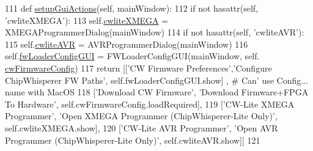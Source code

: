 \begin{DoxyCode}
111     \textcolor{keyword}{def }\hyperlink{classsoftware_1_1chipwhisperer_1_1capture_1_1scopes_1_1openadc__interface_1_1naeusbchip_1_1OpenADCInterface__NAEUSBChip_a3b6ab69776259d4e281d13ce0091c849}{setupGuiActions}(self, mainWindow):
112         \textcolor{keywordflow}{if} \textcolor{keywordflow}{not} hasattr(self, \textcolor{stringliteral}{'cwliteXMEGA'}):
113             self.\hyperlink{classsoftware_1_1chipwhisperer_1_1capture_1_1scopes_1_1openadc__interface_1_1naeusbchip_1_1OpenADCInterface__NAEUSBChip_a6f6ba8bdef3267e43fbfa3025093ef13}{cwliteXMEGA} = XMEGAProgrammerDialog(mainWindow)
114         \textcolor{keywordflow}{if} \textcolor{keywordflow}{not} hasattr(self, \textcolor{stringliteral}{'cwliteAVR'}):
115             self.\hyperlink{classsoftware_1_1chipwhisperer_1_1capture_1_1scopes_1_1openadc__interface_1_1naeusbchip_1_1OpenADCInterface__NAEUSBChip_a4fad83161be25b968ae0066a5a3669df}{cwliteAVR} = AVRProgrammerDialog(mainWindow)
116         self.\hyperlink{classsoftware_1_1chipwhisperer_1_1capture_1_1scopes_1_1openadc__interface_1_1naeusbchip_1_1OpenADCInterface__NAEUSBChip_a2e3c1b3892903a9cf622d20e1898bdc6}{fwLoaderConfigGUI} = FWLoaderConfigGUI(mainWindow, self.
      \hyperlink{classsoftware_1_1chipwhisperer_1_1capture_1_1scopes_1_1openadc__interface_1_1naeusbchip_1_1OpenADCInterface__NAEUSBChip_a2108849fa806dcc5ce6897573f60aa18}{cwFirmwareConfig})
117         \textcolor{keywordflow}{return} [[\textcolor{stringliteral}{'CW Firmware Preferences'},\textcolor{stringliteral}{'Configure ChipWhisperer FW Paths'}, self.fwLoaderConfigGUI.show]
      , \textcolor{comment}{# Can' use Config... name with MacOS}
118                 [\textcolor{stringliteral}{'Download CW Firmware'}, \textcolor{stringliteral}{'Download Firmware+FPGA To Hardware'}, 
      self.cwFirmwareConfig.loadRequired],
119                 [\textcolor{stringliteral}{'CW-Lite XMEGA Programmer'}, \textcolor{stringliteral}{'Open XMEGA Programmer (ChipWhisperer-Lite Only)'},
      self.cwliteXMEGA.show],
120                 [\textcolor{stringliteral}{'CW-Lite AVR Programmer'}, \textcolor{stringliteral}{'Open AVR Programmer (ChipWhisperer-Lite Only)'},
      self.cwliteAVR.show]]
121 \end{DoxyCode}


